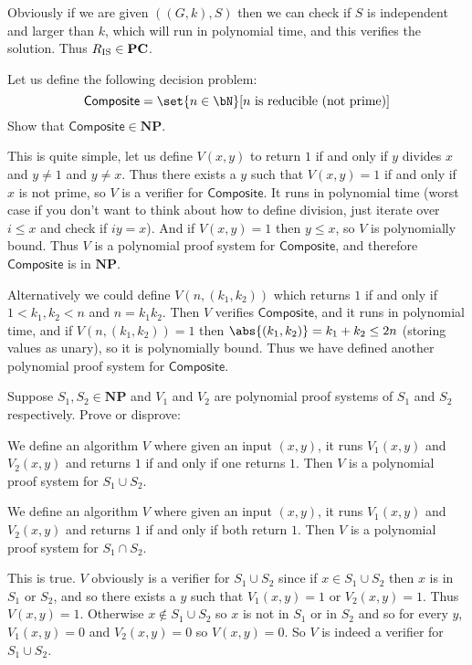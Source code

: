 \documentclass[10pt]{article}
\def\PC{\mathbf{PC}}
\def\NP{\mathbf{NP}}
\begin{document}
    \item Obviously if we are given $((G,k),S)$ then we can check if $S$ is independent and larger than $k$, which will run in polynomial time, and this verifies the solution.
    Thus $\Ris\in\PC$.
\eenum

\def\comp{\mathsf{Composite}}
\begin{exercise*}

    Let us define the following decision problem:
    \[ \comp = \set{n\in\bN}[n\text{ is reducible (not prime)}] \]
    Show that $\comp\in\NP$.

\end{exercise*}

This is quite simple, let us define $V(x,y)$ to return $1$ if and only if $y$ divides $x$ and $y\neq1$ and $y\neq x$.
Thus there exists a $y$ such that $V(x,y)=1$ if and only if $x$ is not prime, so $V$ is a verifier for $\comp$.
It runs in polynomial time (worst case if you don't want to think about how to define division, just iterate over $i\leq x$ and check if $iy=x$).
And if $V(x,y)=1$ then $y\leq x$, so $V$ is polynomially bound.
Thus $V$ is a polynomial proof system for $\comp$, and therefore $\comp$ is in $\NP$.

Alternatively we could define $V(n,(k_1,k_2))$ which returns $1$ if and only if $1<k_1,k_2<n$ and $n=k_1k_2$.
Then $V$ verifies $\comp$, and it runs in polynomial time, and if $V(n,(k_1,k_2))=1$ then $\abs{(k_1,k_2)}=k_1+k_2\leq 2n$ (storing values as unary), so it is polynomially bound.
Thus we have defined another polynomial proof system for $\comp$.

\begin{exercise*}

    Suppose $S_1,S_2\in\NP$ and $V_1$ and $V_2$ are polynomial proof systems of $S_1$ and $S_2$ respectively.
    Prove or disprove:
    \benum
        \item We define an algorithm $V$ where given an input $(x,y)$, it runs $V_1(x,y)$ and $V_2(x,y)$ and returns $1$ if and only if one returns $1$.
        Then $V$ is a polynomial proof system for $S_1\cup S_2$.
        \item We define an algorithm $V$ where given an input $(x,y)$, it runs $V_1(x,y)$ and $V_2(x,y)$ and returns $1$ if and only if both return $1$.
        Then $V$ is a polynomial proof system for $S_1\cap S_2$.
    \eenum

\end{exercise*}

\benum
    \item This is true.
    $V$ obviously is a verifier for $S_1\cup S_2$ since if $x\in S_1\cup S_2$ then $x$ is in $S_1$ or $S_2$, and so there exists a $y$ such that $V_1(x,y)=1$ or $V_2(x,y)=1$.
    Thus $V(x,y)=1$.
    Otherwise $x\notin S_1\cup S_2$ so $x$ is not in $S_1$ or in $S_2$ and so for every $y$, $V_1(x,y)=0$ and $V_2(x,y)=0$ so $V(x,y)=0$.
    So $V$ is indeed a verifier for $S_1\cup S_2$.
\end{document}
